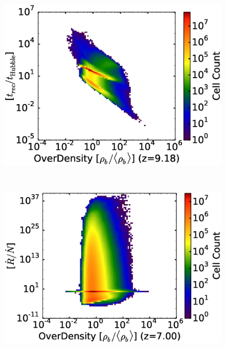 \begin{figure}[!tp]
\begin{minipage}[h]{0.33\linewidth}
       \centering
       \includegraphics[trim = 5mm 8mm 0mm 0mm, clip, width=1.0\textwidth]{1_3_HD4050OverDensityRecombHubbleTime.eps}
    \end{minipage}
\\
     \begin{minipage}[h]{0.33\linewidth}
        \centering
        \includegraphics[trim = 5mm 8mm 0mm 0mm, clip, width=1.0\textwidth]{2_1_HD7900OverDensityRecombIonFrac.eps}
     \end{minipage}
\hspace*{-2.00mm}
    \begin{minipage}[h]{0.33\linewidth}
       \centering

\end{minipage}
\end{figure}
